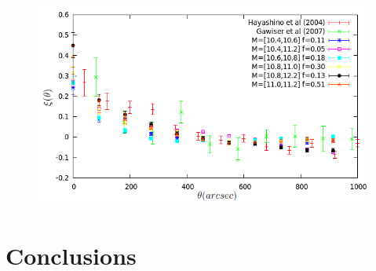 \documentclass{emulateapj}
\begin{document}
\begin{figure}
\begin{center}
\includegraphics[width=1.00\linewidth,angle=0]{./plots/correlation_best_models_with_obs_comp.png}
\end{center} 
\caption{ \label{figure:landscape} 
}
\end{figure}

% 

\section{Conclusions}
\end{document}
